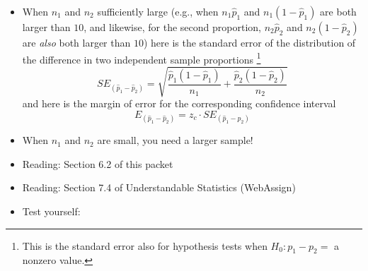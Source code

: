 \documentclass[11pt]{article}
\begin{document}
\begin{enumerate}[resume]
\begin{enumerate}
    \begin{itemize}
        \item When $n_1$ and $n_2$ sufficiently large (e.g., when $n_1\hat{p}_1$ and $n_1(1-\hat{p}_1)$ are both larger than $10$, and likewise, for the second proportion, $n_2\hat{p}_2$ and $n_2(1-\hat{p}_2)$ are \emph{also} both larger than $10$) here is the standard error of the distribution of the difference in two independent sample proportions%
 \footnote{%
This is the standard error also for hypothesis tests when $H_0: p_1 -p_2 =$ a nonzero value.
    }
\[SE_{(\hat{p}_1 - \hat{p}_2)} = \sqrt{\frac{ \hat{p}_1 (1 - \hat{p}_1)}{n_1} + \frac{ \hat{p}_2 (1 - \hat{p}_2)}{n_2} } \]
    and here is the margin of error for the corresponding confidence interval
\[E_{(\hat{p}_1 - \hat{p}_2)} = z_c \cdot SE_{(\hat{p}_1 - \hat{p}_2)}\]
    \item When $n_1$ and $n_2$ are small, you need a larger sample!
    \end{itemize}
\end{enumerate}
\end{enumerate}

{\it
\vspace{-0.55cm}
\begin{itemize}
\renewcommand{\labelitemi}{{$\ast$}}
\item Reading: Section 6.2 of this packet
\item Reading: Section 7.4 of Understandable Statistics (WebAssign)
\item Test yourself:
\end{itemize}
}
\end{document}
